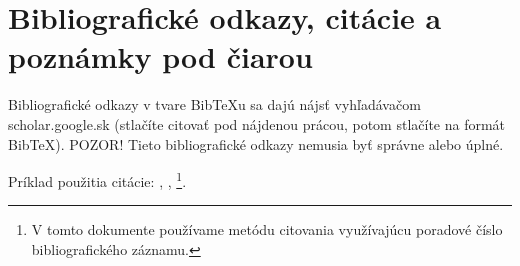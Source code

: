 \section*{Bibliografické odkazy, citácie a poznámky pod čiarou}
Bibliografické odkazy v tvare BibTeXu sa dajú nájsť vyhľadávačom scholar.google.sk (stlačíte citovať pod nájdenou prácou, potom stlačíte na formát BibTeX). POZOR! Tieto bibliografické odkazy nemusia byť správne alebo úplné.

Príklad použitia citácie: \cite{einstein}, \cite{latexcompanion}, \cite{joosten2015voice} \cite{knuthwebsite}
\cite{vieriu2014real}
\footnote{V tomto dokumente používame metódu citovania využívajúcu poradové číslo bibliografického záznamu.}.
